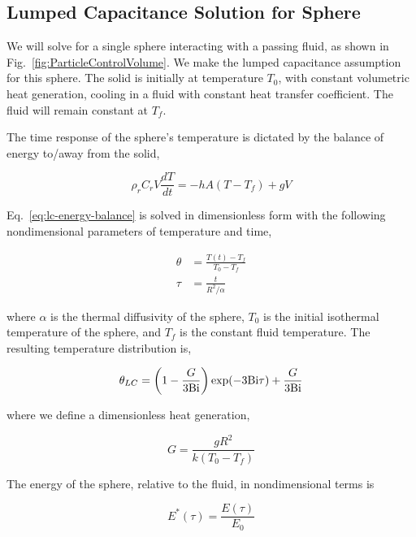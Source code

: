 \subsection{Lumped Capacitance Solution for Sphere}\label{sec:lumped-capacitance}
We will solve for a single sphere interacting with a passing fluid, as shown in Fig.~\ref{fig:ParticleControlVolume}. We make the lumped capacitance assumption for this sphere. The solid is initially at temperature $T_0$, with constant volumetric heat generation, cooling in a fluid with constant heat transfer coefficient. The fluid will remain constant at $T_f$.

The time response of the sphere's temperature is dictated by the balance of energy to/away from the solid,  

\begin{equation}\label{eq:lc-energy-balance}
	\rho_rC_rV\frac{dT}{dt} = -hA(T-T_f) + gV
\end{equation}

Eq.~\ref{eq:lc-energy-balance} is solved in dimensionless form with the following nondimensional parameters of temperature and time,

\begin{subequations}
\begin{align}
    \theta &= \frac{T(t) - T_f}{T_0 - T_f}\\
    \tau & = \frac{t}{R^2/\alpha}
\end{align}
\end{subequations}

where $\alpha$ is the thermal diffusivity of the sphere, $T_0$ is the initial isothermal temperature of the sphere, and $T_f$ is the constant fluid temperature. The resulting temperature distribution is,

\begin{equation}
\label{eq:theta-lc}
	\theta_{LC}=\left(1-\frac{G}{3\mathrm{Bi}}\right)\exp(-3\mathrm{Bi} \tau) + \frac{G}{3\mathrm{Bi}}
\end{equation}

where we define a dimensionless heat generation,

\begin{equation}\label{eq:nondimensional-heat-generation}
	G = \frac{gR^2}{k(T_0 - T_f)}
\end{equation}

The energy of the sphere, relative to the fluid, in nondimensional terms is 

\begin{equation}
    E^*(\tau)=\frac{E(\tau)}{E_0}
\end{equation}


